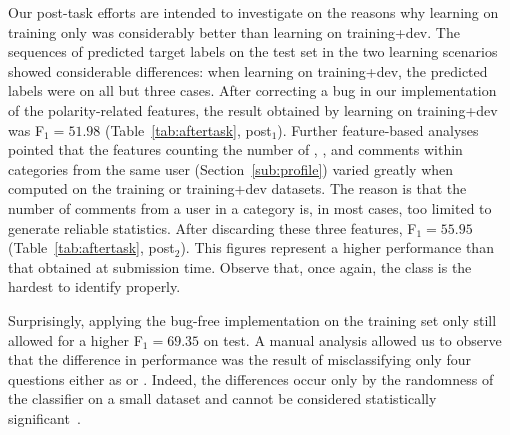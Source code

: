 Our post-task efforts are intended to investigate on the reasons why learning on 
training only was considerably better than learning on training+dev. The 
sequences of predicted target labels on the test set in the two learning 
scenarios showed considerable differences: when learning on training+dev, the 
predicted labels were \yes on all but three cases. After correcting a bug in our 
implementation of the polarity-related features, the result obtained 
by learning on training+dev was F$_1=51.98$ (Table~\ref{tab:aftertask}, 
post$_1$). Further feature-based analyses pointed 
that the features counting the number of \good, \bad, and \pot comments within 
categories from the same user (\cf Section~\ref{sub:profile}) varied greatly 
when computed on the training or training+dev datasets. The reason is that the 
number of comments from a user in a category is, in most cases, too limited to 
generate reliable statistics. After discarding these three features, F$_1 = 
55.95$ (Table~\ref{tab:aftertask}, post$_2$). This figures represent a higher 
performance than that obtained at submission time. Observe that, once again, the 
\unsure class is the hardest to identify properly.

Surprisingly, applying the bug-free implementation on the training set only 
still allowed for a higher F$_1 =69.35$ on test.
A manual analysis allowed us to observe that the difference in performance was 
the result of misclassifying only four questions either as \yes or \unsure. 
Indeed, the differences occur only by the randomness of the classifier on 
a small dataset and cannot be considered statistically 
significant~\cite{Marquez-EtAl:2015:SemEval}. 

